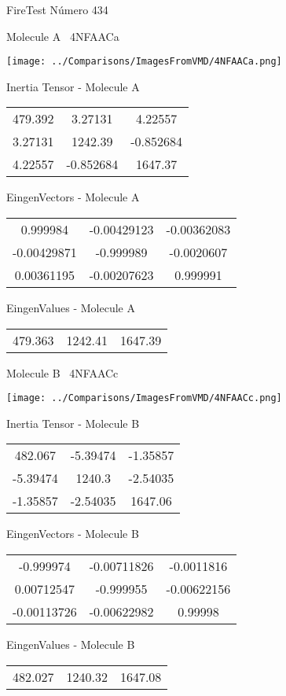 \vtab[-3cm]
\begin{center}
{\large FireTest \tab Número 434}
\end{center}
\begin{multicols}{2}
\begin{center}

Molecule A \
4NFAACa

\texttt{[image: ../Comparisons/ImagesFromVMD/4NFAACa.png]}

Inertia Tensor - Molecule A \\
\begin{tabular}{|c c c|}
479.392	 & 	3.27131	 & 	4.22557	 \\
3.27131	 & 	1242.39	 & 	-0.852684	 \\
4.22557	 & 	-0.852684	 & 	1647.37
\end{tabular}

\vtab
 EingenVectors - Molecule A     \\
\begin{tabular}{|c c c|}
0.999984	 & 	-0.00429123	 & 	-0.00362083	 \\
-0.00429871	 & 	-0.999989	 & 	-0.0020607	 \\
0.00361195	 & 	-0.00207623	 & 	0.999991
\end{tabular}

\vtab
 EingenValues - Molecule A     \\
\begin{tabular}{|c c c|}
479.363	 & 	1242.41	 & 	1647.39	 \\
\end{tabular}
\columnbreak

Molecule B \
4NFAACc

\texttt{[image: ../Comparisons/ImagesFromVMD/4NFAACc.png]}

Inertia Tensor - Molecule B \\
\begin{tabular}{|c c c|}
482.067	 & 	-5.39474	 & 	-1.35857	 \\
-5.39474	 & 	1240.3	 & 	-2.54035	 \\
-1.35857	 & 	-2.54035	 & 	1647.06
\end{tabular}

\vtab
 EingenVectors - Molecule B     \\
\begin{tabular}{|c c c|}
-0.999974	 & 	-0.00711826	 & 	-0.0011816	 \\
0.00712547	 & 	-0.999955	 & 	-0.00622156	 \\
-0.00113726	 & 	-0.00622982	 & 	0.99998
\end{tabular}

\vtab
 EingenValues - Molecule B     \\
\begin{tabular}{|c c c|}
482.027	 & 	1240.32	 & 	1647.08	 \\
\end{tabular}

\end{center}
\end{multicols}

